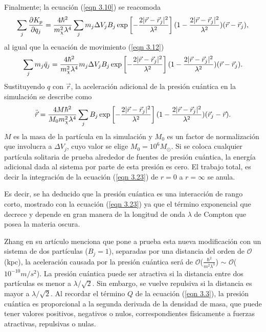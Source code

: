 \documentclass[a4paper,openright,12pt]{book}
\begin{document}
Finalmente; la ecuación (\ref{eqn 3.10}) se reacomoda
\begin{equation}
\footnotesize{\sum_{j} \frac{\partial K_{p}}{\partial q_{j}}
=
\frac{4\hbar^{2}}{m_{\chi}^{2}\lambda^{4}}
\sum_{j}m_{j}\Delta V_{j}B_{j}
\exp\left[
-\frac{2|\vec{r}-\vec{r}_{j}|^{2}}{\lambda^{2}}\right]
(1-\frac{2|\vec{r}-\vec{r}_{j}|^{2}}{\lambda^{2}})
(\vec{r}-\vec{r}_{j})},\label{eqn 3.21}
\end{equation}
al igual que la ecuación de movimiento (\ref{eqn 3.12})
\begin{equation}
\footnotesize{\sum_{j}m_{j}\ddot{q}_{j}
=
\frac{4\hbar^{2}}{m_{\chi}^{2}\lambda^{4}}
m_{j}\Delta V_{j}B_{j}
\exp\left[
-\frac{2|\vec{r}-\vec{r}_{j}|^{2}}{\lambda^{2}}\right]
(1-\frac{2|\vec{r}-\vec{r}_{j}|^{2}}{\lambda^{2}})
(\vec{r}-\vec{r}_{j}).}\label{eqn 3.22}
\end{equation}
Sustituyendo $q$ con $\vec{r}$, la aceleración adicional de la presión cuántica en la simulación se describe como
\begin{equation}
\footnotesize{\ddot{\vec{r}}
=
\frac{4M\hbar^{2}}{M_{0}m_{\chi}^{2}\lambda^{4}}
\sum_{j}B_{j}
\exp\left[
-\frac{2|\vec{r}-\vec{r}_{j}|^{2}}{\lambda^{2}}\right]
(1-\frac{2|\vec{r}-\vec{r}_{j}|^{2}}{\lambda^{2}})
(\vec{r}_{j}-\vec{r}).}\label{eqn 3.23}
\end{equation}
$M$ es la masa de la partícula en la simulación y $M_{0}$ es un factor de normalización que involucra a $\Delta V_{j}$, cuyo valor se elige $M_{0} = 10^{6} M_{\odot}$. Si se coloca cualquier partícula solitaria de prueba alrededor de fuentes de presión cuántica, la energía adicional dada al sistema por parte de esta presión es cero. El trabajo total, es decir la integración de la ecuación (\ref{eqn 3.23}) de $r=0$ a $r=\infty$ se anula. 

Es decir, se ha deducido que la presión cuántica es una interacción de rango corto, mostrado con la ecuación (\ref{eqn 3.23}) ya que el término exponencial que decrece y depende en gran manera de la longitud de onda $\lambda$ de Compton que posea la materia oscura.

Zhang en su artículo menciona que pone a prueba esta nueva modificación con un sistema de dos partículas ($B_{j}=1$), separadas por una distancia del orden de $\mathcal{O}$(kpc), la aceleración causada por la presión cuántica será de $\mathcal{O}$($\frac{\hbar^{2}}{m^{2}\lambda^{3}}$) $\sim$ $\mathcal{O}$($10^{-10}m/s^{2}$). La presión cuántica puede ser atractiva si la distancia entre dos partículas es menor a $\lambda/\sqrt{2}$. Sin embargo, se vuelve repulsiva si la distancia es mayor a $\lambda/\sqrt{2}$. Al recordar el término $Q$ de la ecuación (\ref{eqn 3.3}), la presión cuántica es proporcional a la segunda derivada de la densidad de masa, que puede tener valores positivos, negativos o nulos, correspondientes físicamente a fuerzas atractivas, repulsivas o nulas. 
\end{document}
